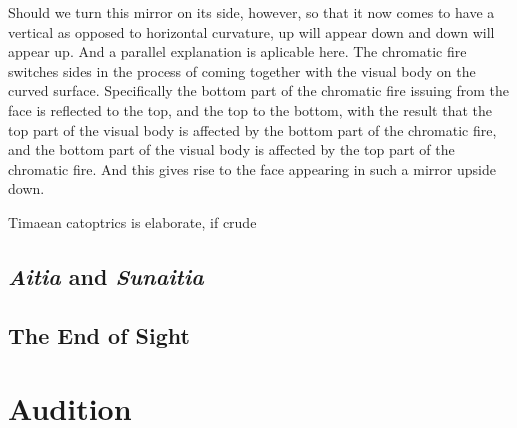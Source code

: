 Should we turn this mirror on its side, however, so that it now comes to have a vertical as opposed to horizontal curvature, up will appear down and down will appear up. And a parallel explanation is aplicable here. The chromatic fire switches sides in the process of coming together with the visual body on the curved surface. Specifically the bottom part of the chromatic fire issuing from the face is reflected to the top, and the top to the bottom, with the result that the top part of the visual body is affected by the bottom part of the chromatic fire, and the bottom part of the visual body is affected by the top part of the chromatic fire. And this gives rise to the face appearing in such a mirror upside down.

Timaean catoptrics is elaborate, if crude


\subsection{\emph{Aitia} and \emph{Sunaitia}} %
\label{sub:_emph_aitia_and_emph_sunaitia}




\subsection{The End of Sight} %
\label{sub:the_end_of_sight}



\section{Audition} %
\label{sec:audition}





